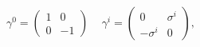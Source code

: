 \begin{equation}
  \gamma^0=\left(\begin{array}{cc} 
      1 & 0 \\ 0 & -1 \end{array}\right)\, \quad
  \gamma^i=\left(\begin{array}{cc} 
0 & \sigma^i \\ -\sigma^i & 0 \end{array}\right),
\end{equation}

